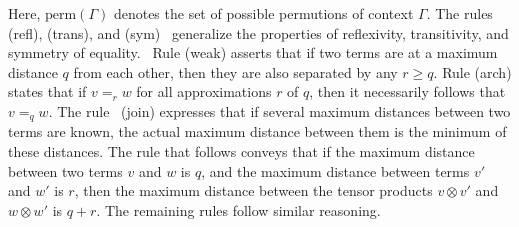 Here, $\text{perm} (\Gamma)$ denotes the set of possible permutions of context $\Gamma$. The rules (refl), (trans), and (sym)  generalize the properties of reflexivity, transitivity, and symmetry of equality.  Rule (weak) asserts that if two terms are at a maximum distance $q$ from each other, then they are also separated by any $r \geq q$. Rule (arch) states that if $v =_r w$ for all approximations $r$ of $q$, then it necessarily follows that $v =_q w$. The rule  (join) expresses that if several maximum distances between two terms are known, the actual maximum distance between them is the minimum of these distances. The rule that follows conveys that if the maximum distance between two terms $v$ and $w$ is $q$, and the maximum distance between terms $v'$ and $w'$ is $r$, then the maximum distance between the tensor products $v \otimes v'$ and $w \otimes w'$ is $q + r$. The remaining rules follow similar reasoning.


